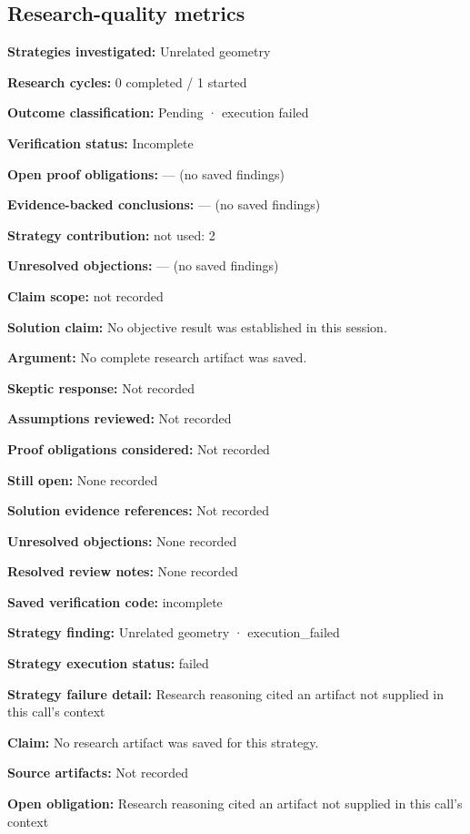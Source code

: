 \documentclass[11pt]{article}
\begin{document}
\subsection{Research-quality metrics}
\textbf{Strategies investigated:} Unrelated geometry\par
\textbf{Research cycles:} 0 completed / 1 started\par
\textbf{Outcome classification:} Pending · execution failed\par
\textbf{Verification status:} Incomplete\par
\textbf{Open proof obligations:} — (no saved findings)\par
\textbf{Evidence-backed conclusions:} — (no saved findings)\par
\textbf{Strategy contribution:} not used: 2\par
\textbf{Unresolved objections:} — (no saved findings)\par
\textbf{Claim scope:} not recorded\par
\textbf{Solution claim:} No objective result was established in this session.\par
\textbf{Argument:} No complete research artifact was saved.\par
\textbf{Skeptic response:} Not recorded\par
\textbf{Assumptions reviewed:} Not recorded\par
\textbf{Proof obligations considered:} Not recorded\par
\textbf{Still open:} None recorded\par
\textbf{Solution evidence references:} Not recorded\par
\textbf{Unresolved objections:} None recorded\par
\textbf{Resolved review notes:} None recorded\par
\textbf{Saved verification code:} incomplete\par
\textbf{Strategy finding:} Unrelated geometry · execution\_failed\par
\textbf{Strategy execution status:} failed\par
\textbf{Strategy failure detail:} Research reasoning cited an artifact not supplied in this call's context\par
\textbf{Claim:} No research artifact was saved for this strategy.\par
\textbf{Source artifacts:} Not recorded\par
\textbf{Open obligation:} Research reasoning cited an artifact not supplied in this call's context\par
\end{document}
